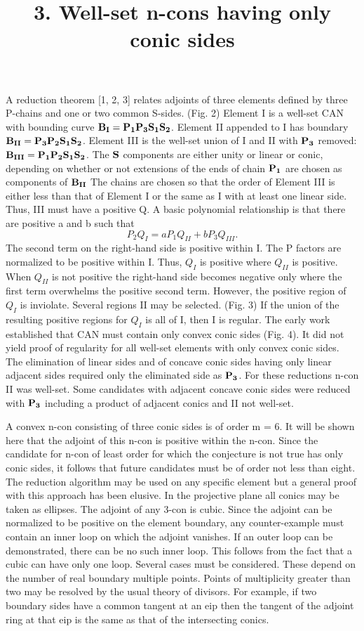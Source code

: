 \documentclass{article}
\begin{document}
A reduction theorem [1, 2, 3] relates adjoints of three elements defined by three P-chains and one or two common S-sides.  (Fig. 2)    Element I is a well-set CAN with  bounding curve $\bf{B}_I = \bf{P}_1\bf{P}_3\bf{S}_1\bf{S}_2$.  Element II appended to I has boundary $\bf{B}_{II} = \bf{P}_3\bf{P}_2\bf{S}_1\bf{S}_2$.  Element III is the well-set union of I and II with $\bf{P}_3$ removed: $\bf{B}_{III} = \bf{P}_1\bf{P}_2\bf{S}_1\bf{S}_2$.   The $\bf{S}$ components are either unity or linear or conic, depending on whether or not extensions of the ends of chain $\bf{P}_1$ are chosen as components of $\bf{B}_{II}$  The chains are chosen so that the order of Element III is either less than that of Element I or the same as I with at least one linear side. Thus, III must have a positive Q.  A basic polynomial relationship is that there are positive a and b such that
\begin{equation}
P_2 Q_I = a P_1Q_{II} + b P_3Q_{III}.
\end{equation}
The second term on the right-hand side is positive within I.  The P factors are normalized to be positive within I. Thus, $Q_I$ is positive where $Q_{II}$ is positive.  When $Q_{II}$ is not positive the right-hand side becomes negative only where the first term overwhelms the positive second term.  However, the positive region of $Q_I$ is inviolate.  Several regions II may be selected.  (Fig. 3)
If the union of the resulting positive regions for $Q_I$ is all of I, then I is regular.  The early work established that CAN must contain only convex conic sides (Fig. 4).  It did not yield proof of regularity for all well-set elements with only convex conic sides.  The elimination of linear sides and of concave conic sides having only linear adjacent sides required only the eliminated side as $\bf{P}_3$.  For these reductions n-con II was well-set.  Some candidates with adjacent concave conic sides were reduced with $\bf{P_3}$ including a product of adjacent conics and II not well-set.
\par
\title{3. Well-set n-cons having only conic sides}
\par
A convex n-con consisting of three conic sides is of order m = 6.  It will be shown here that the adjoint of this n-con is positive within the n-con.  Since the candidate for n-con of least order
for which the conjecture is not true has only conic sides, it follows that future candidates must be of order not less than eight.  The reduction algorithm may be used on any specific element but a general proof with this approach has been elusive.  In the projective plane all conics may be taken as ellipses.  The adjoint of any 3-con is cubic.  Since the adjoint can be normalized to be positive on the element boundary, any counter-example must contain an inner loop on which the adjoint vanishes.  If an outer loop can be demonstrated, there can be no such inner loop.  This follows from the fact that a cubic can have only one loop.  Several cases must be considered.  These depend on the number of real boundary multiple points.  Points of multiplicity greater than two may be resolved by the usual theory of divisors.  For example, if two boundary sides have a common tangent at an eip then the tangent of the adjoint ring at that eip is the same as that of the intersecting conics.  
\end{document}
